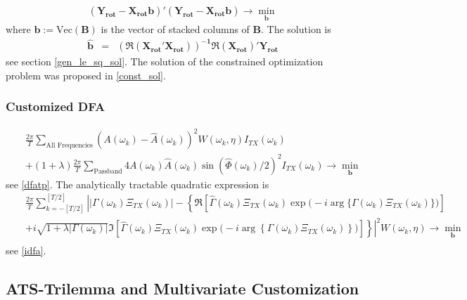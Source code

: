 \documentclass[a4paper]{book}
\begin{document}
\begin{eqnarray}\label{regms_e}
(\mathbf{Y_{\textrm{rot}}-X_{\textrm{rot}}b})'(\mathbf{Y_{\textrm{rot}}-X_{\textrm{rot}}b})\to\min_{\mathbf{b}}
\end{eqnarray}
where $\mathbf{b}:=\textrm{Vec}(\mathbf{B})$ is the vector of stacked columns of $\mathbf{B}$. The solution is
\begin{eqnarray}\label{bregms_e}
\mathbf{\hat{b}}&=&\mathbf{\left(\Re(X_{\textrm{rot}}'X_{\textrm{rot}})\right)^{-1}\Re(X_{\textrm{rot}})'Y_{\textrm{rot}}}
\end{eqnarray}
see section \ref{gen_le_sq_sol}. The solution of the constrained optimization problem was proposed in \ref{const_sol}. 


\subsubsection{Customized DFA}

\begin{eqnarray}
&&\frac{2\pi}{ T} \sum_{\textrm{All~Frequencies}} (A(\omega_k)-\hat{A}(\omega_k))^2 W(\omega_k,\eta) I_{TX}(\omega_k)\nonumber\\
&&+(1+\lambda)\frac{2\pi}{ T}  \sum_{\textrm{Passband}} 4A(\omega_k)\hat{A}(\omega_k)\sin(\hat{\Phi}(\omega_k)/2)^2
I_{TX}(\omega_k)\to\min_{\mathbf{b}}\label{dfatp_e}
\end{eqnarray}
see \ref{dfatp}. The analytically tractable quadratic expression is
\begin{eqnarray}\label{idfa_s}
&&\frac{2\pi}{T} \sum_{k=-[T/2]}^{[T/2]}
 \left|\big|\Gamma(\omega_k)\Xi_{TX}(\omega_k)\big|-\left\{\Re\left[\hat{\Gamma}(\omega_k)\Xi_{TX}(\omega_k)\exp\big(-i\arg\big\{\Gamma(\omega_k)\Xi_{TX}(\omega_k)\big\}\big)\right]\right.\right.\nonumber\\
 &&\left.\left.+i\sqrt{1+\lambda|\Gamma(\omega_k)|}
 \Im\left[\hat{\Gamma}(\omega_k)\Xi_{TX}(\omega_k)\exp\big(-i\arg\left\{\Gamma(\omega_k)\Xi_{TX}(\omega_k)\right\}\big)\right]\right\}\right|^2 W(\omega_k,\eta)\to\min_{\mathbf{b}}\nonumber\\
\end{eqnarray}
see \ref{idfa}.



\subsection{ATS-Trilemma and Multivariate Customization}\label{ats_tr_mu_cu}
\end{document}

